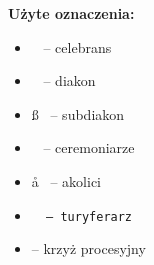 \thispagestyle{empty}

\begin{center}
	\vspace*{2cm}


	\vspace{\fill}

	{\large \textbf{Użyte oznaczenia:}} \\

	\vspace{0.1\textwidth}

	{\large\centering
		\begin{itemize}[leftmargin=.43\linewidth,rightmargin=.35\linewidth,label=]
			\item \ii~ -- celebrans
			\item \dd~ -- diakon
			\item \ss~ -- subdiakon
			\item \cc~ -- ceremoniarze
			\item \aa~ -- akolici
			\item \tt~ -- turyferarz
			\item {} -- krzyż procesyjny
		\end{itemize}
	}

	\vspace{\fill}

\end{center}

